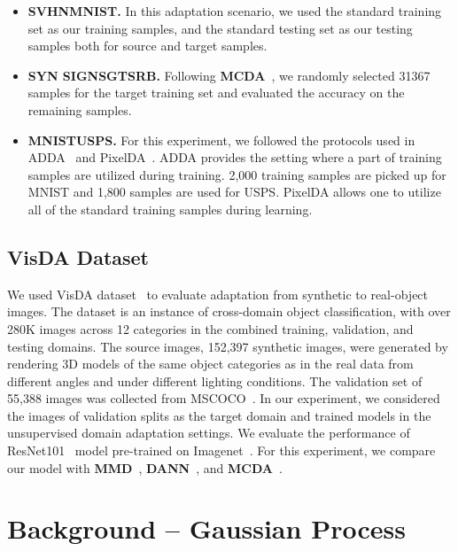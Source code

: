 \documentclass[10pt,letterpaper]{article}
\begin{document}
\begin{itemize}
\item \textbf{SVHNMNIST.}
In this adaptation scenario, we used the standard training set as our training samples, and the standard testing set as our testing samples both for source and target samples.

\item \textbf{SYN SIGNSGTSRB.}
Following \textbf{MCDA}~\cite{saito2018}, we randomly selected 31367 samples for the target training set and evaluated the accuracy on the remaining samples. 

\item \textbf{MNISTUSPS.}
For this experiment, we followed the protocols used in ADDA~\cite{tzeng2017adversarial} and PixelDA~\cite{bousmalis2017unsupervised}. ADDA provides the setting where a part of training samples are utilized during training. 2,000 training samples are picked up for MNIST and 1,800 samples are used for USPS.
PixelDA allows one to utilize all of the standard training samples during learning.
\end{itemize}

\subsection{VisDA Dataset}
We used VisDA dataset~\cite{peng2017visda}  to evaluate adaptation from synthetic to real-object images. The dataset is an instance of cross-domain object classification, with over 280K images across 12 categories in the combined training, validation, and testing domains. The source images, 152,397 synthetic images, were generated by rendering 3D models of the same object categories as in the real data from different angles and under different lighting conditions. The validation set of 55,388 images was collected from MSCOCO~\cite{lin2014microsoft}. In our experiment, we considered the images of validation splits as the target domain and trained models in the unsupervised domain adaptation settings. We evaluate the performance of ResNet101~\cite{he2016deep} model pre-trained on Imagenet~\cite{deng2009imagenet}. For this experiment, we compare our model with \textbf{MMD}~\cite{long2015learning}, \textbf{DANN}~\cite{ganin2014unsupervised}, and \textbf{MCDA}~\cite{saito2018}.


\section{Background -- Gaussian Process}\label{sec:gpmodel}
\end{document}
